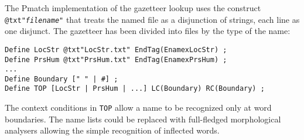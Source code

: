 \documentclass{llncs}
\begin{document}


\begin{sloppypar}
The Pmatch implementation of the gazetteer lookup uses the construct
\texttt{@txt"\textit{filename}"} that treats the named file as a
disjunction of strings, each line as one disjunct. The gazetteer has
been divided into files by the type of the name:
\end{sloppypar}

\begin{verbatim}
Define LocStr @txt"LocStr.txt" EndTag(EnamexLocStr) ;
Define PrsHum @txt"PrsHum.txt" EndTag(EnamexPrsHum) ;
...
Define Boundary [" " | #] ;
Define TOP [LocStr | PrsHum | ...] LC(Boundary) RC(Boundary) ;
\end{verbatim}

\noindent
The context conditions in \texttt{TOP} allow a name to be recognized
only at word boundaries. The name lists could be replaced with
full-fledged morphological analysers allowing the simple recognition
of inflected words.

\end{document}
